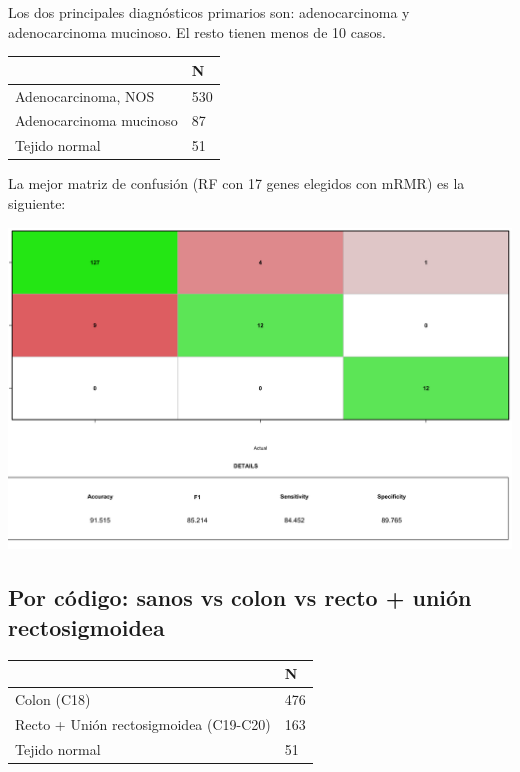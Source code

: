 Los dos principales diagnósticos primarios son: adenocarcinoma y adenocarcinoma mucinoso. El resto tienen menos de 10 casos.

\begin{table}[H]
	\centering
	\begin{tabular}{|l|l|}
		\hline
		& N   \\ \hline
		Adenocarcinoma, NOS     & 530 \\ \hline
		Adenocarcinoma mucinoso & 87  \\ \hline
		Tejido normal           & 51  \\ \hline
	\end{tabular}
\end{table}

La mejor matriz de confusión (RF con 17 genes elegidos con mRMR) es la siguiente:

\begin{center}
	\includegraphics[width=.7\textwidth]{figuras/auxiliares/cr_04_analisis_multiclase_primary_diagnosis/25_rf_matriz_confusion_mejor_metodo.png} 
\end{center}

\subsection{Por código: sanos vs colon vs recto + unión rectosigmoidea}

\begin{table}[H]
	\centering
	\begin{tabular}{|l|l|}
		\hline
		& N   \\ \hline
		Colon (C18)    & 476 \\ \hline
		Recto + Unión rectosigmoidea (C19-C20) & 163  \\ \hline
		Tejido normal           & 51  \\ \hline
	\end{tabular}
\end{table}

